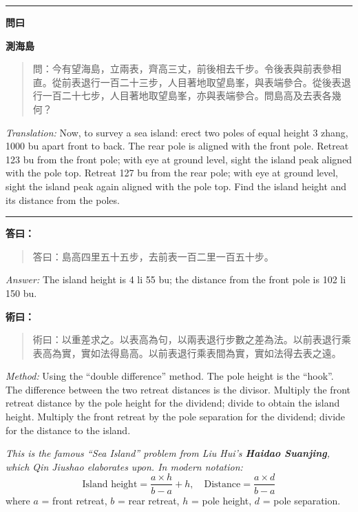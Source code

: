 \documentclass[11pt,a4paper]{article}
\newenvironment{problem}[1][]{%
  \medskip\noindent\rule{\textwidth}{0.4pt}%
  \par\noindent\textbf{\color{sectioncolor}#1}\par\nopagebreak%
  \smallskip%
}{%
  \par\noindent\rule{\textwidth}{0.4pt}\medskip%
}
\newenvironment{answer}{%
  \medskip\noindent{\color{answercolor}\rule{0.5\textwidth}{0.5pt}}%
  \par\color{answercolor}%
}{%
  \par\medskip%
}
\newenvironment{method}{%
  \medskip\noindent{\color{methodcolor}\rule{0.5\textwidth}{0.5pt}}%
  \par\color{methodcolor}%
}{%
  \par\medskip%
}
\begin{document}
\begin{problem}[\textbf{問曰}]
\textbf{\color{sectioncolor}測海島}

\begin{quote}
\textcolor{chinacolor}{%
問：今有望海島，立兩表，齊高三丈，前後相去千步。令後表與前表參相直。從前表退行一百二十三步，人目著地取望島峯，與表端參合。從後表退行一百二十七步，人目著地取望島峯，亦與表端參合。問島高及去表各幾何？
}
\end{quote}

\textit{Translation:} Now, to survey a sea island: erect two poles of 
equal height 3 zhang, 1000 bu apart front to back. The rear pole is 
aligned with the front pole. Retreat 123 bu from the front pole; with 
eye at ground level, sight the island peak aligned with the pole top. 
Retreat 127 bu from the rear pole; with eye at ground level, sight the 
island peak again aligned with the pole top. Find the island height and 
its distance from the poles.
\end{problem}

\begin{answer}
\textbf{答曰：}

\begin{quote}
\textcolor{chinacolor}{%
答曰：島高四里五十五步，去前表一百二里一百五十步。
}
\end{quote}

\textit{Answer:} The island height is 4 li 55 bu; the distance from the 
front pole is 102 li 150 bu.
\end{answer}

\begin{method}
\textbf{術曰：}

\begin{quote}
\textcolor{chinacolor}{%
術曰：以重差求之。以表高為句，以兩表退行步數之差為法。以前表退行乘表高為實，實如法得島高。以前表退行乘表間為實，實如法得去表之遠。
}
\end{quote}

\textit{Method:} Using the ``double difference'' method. The pole height 
is the ``hook''. The difference between the two retreat distances is 
the divisor. Multiply the front retreat distance by the pole height for 
the dividend; divide to obtain the island height. Multiply the front 
retreat by the pole separation for the dividend; divide for the distance 
to the island.

\medskip
\textit{This is the famous ``Sea Island'' problem from Liu Hui's \textbf{Haidao Suanjing}, 
which Qin Jiushao elaborates upon. In modern notation:}
\[
\text{Island height} = \frac{a \times h}{b - a} + h, \quad
\text{Distance} = \frac{a \times d}{b - a}
\]
where $a$ = front retreat, $b$ = rear retreat, $h$ = pole height, $d$ = pole separation.
\end{method}
\end{document}
